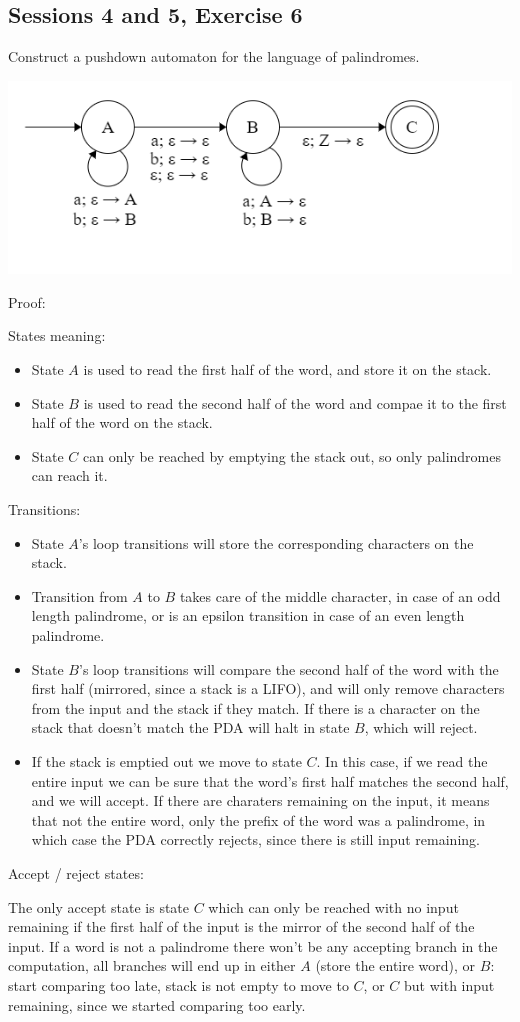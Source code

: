 \subsection{Sessions 4 and 5, Exercise 6}
\label{4_6}


Construct a pushdown automaton for the language of palindromes.


\includegraphics[width=0.5\linewidth]{04/4_6.png}

Proof:

States meaning:
\begin{itemize}
    \item State $A$ is used to read the first half of the word, and store it on the stack.
    \item State $B$ is used to read the second half of the word and compae it to the first half of the word on the stack.
    \item State $C$ can only be reached by emptying the stack out, so only palindromes can reach it.
\end{itemize}

Transitions:

\begin{itemize}
    \item State $A$'s loop transitions will store the corresponding characters on the stack.
    \item Transition from $A$ to $B$ takes care of the middle character, in case of an odd length palindrome, or is an epsilon transition in case of an even length palindrome.
    \item State $B$'s loop transitions will compare the second half of the word with the first half (mirrored, since a stack is a LIFO), and will only remove characters from the input and the stack if they match. If there is a character on the stack that doesn't match the PDA will halt in state $B$, which will reject.
    \item If the stack is emptied out we move to state $C$. In this case, if we read the entire input we can be sure that the word's first half matches the second half, and we will accept. If there are charaters remaining on the input, it means that not the entire word, only the prefix of the word was a palindrome, in which case the PDA correctly rejects, since there is still input remaining.
\end{itemize}

Accept / reject states:

The only accept state is state $C$ which can only be reached with no input remaining if the first half of the input is the mirror of the second half of the input. If a word is not a palindrome there won't be any accepting branch in the computation, all branches will end up in either $A$ (store the entire word), or $B$: start comparing too late, stack is not empty to move to $C$, or $C$ but with input remaining, since we started comparing too early.